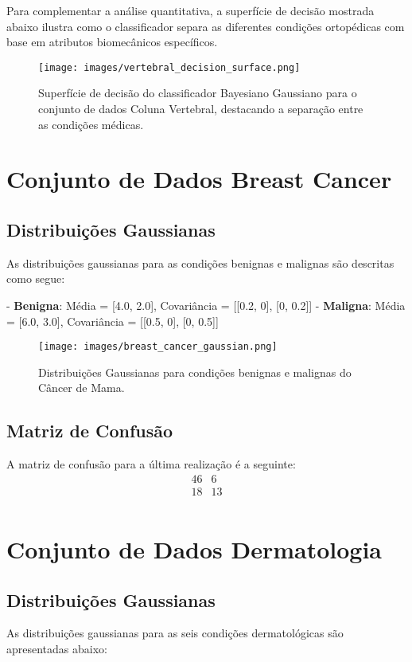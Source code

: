 \documentclass[12pt, a4paper]{report}
\begin{document}
Para complementar a análise quantitativa, a superfície de decisão mostrada abaixo ilustra como o classificador separa as diferentes condições ortopédicas com base em atributos biomecânicos específicos.

\begin{figure}[H]
\centering
\texttt{[image: images/vertebral\_decision\_surface.png]}
\caption{Superfície de decisão do classificador Bayesiano Gaussiano para o conjunto de dados Coluna Vertebral, destacando a separação entre as condições médicas.}
\label{fig:spine_decision_surface}
\end{figure}

\section{Conjunto de Dados Breast Cancer}

\subsection{Distribuições Gaussianas}
As distribuições gaussianas para as condições benignas e malignas são descritas como segue:

- \textbf{Benigna}: Média = [4.0, 2.0], Covariância = [[0.2, 0], [0, 0.2]]
- \textbf{Maligna}: Média = [6.0, 3.0], Covariância = [[0.5, 0], [0, 0.5]]

\begin{figure}[H]
\centering
\texttt{[image: images/breast\_cancer\_gaussian.png]}
\caption{Distribuições Gaussianas para condições benignas e malignas do Câncer de Mama.}
\label{fig:gaussian_breast_cancer}
\end{figure}

\subsection{Matriz de Confusão}
A matriz de confusão para a última realização é a seguinte:
\[
\begin{array}{cc}
46 & 6 \\
18 & 13 \\
\end{array}
\]

\section{Conjunto de Dados Dermatologia}

\subsection{Distribuições Gaussianas}
As distribuições gaussianas para as seis condições dermatológicas são apresentadas abaixo:
\end{document}
